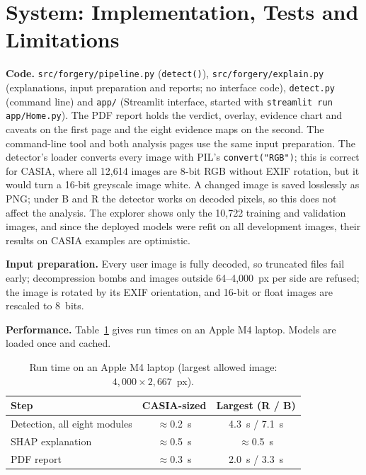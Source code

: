 \section{System: Implementation, Tests and Limitations}\label{app:system}

\textbf{Code.} \texttt{src/forgery/pipeline.py} (\texttt{detect()}), \texttt{src/forgery/explain.py} (explanations,
input preparation and reports; no interface code), \texttt{detect.py} (command line) and \texttt{app/} (Streamlit
interface, started with \texttt{streamlit run app/Home.py}). The PDF report holds the verdict, overlay, evidence chart
and caveats on the first page and the eight evidence maps on the second. The command-line tool and both analysis pages
use the same input preparation. The detector's loader converts every image with PIL's \texttt{convert("RGB")}; this
is correct for CASIA, where all 12,614 images are 8-bit RGB without EXIF rotation, but it would turn a 16-bit greyscale
image white. A changed image is saved losslessly as PNG; under B and R the detector works on decoded pixels, so this
does not affect the analysis. The explorer shows only the 10,722 training and validation images, and since the
deployed models were refit on all development images, their results on CASIA examples are optimistic.

\textbf{Input preparation.} Every user image is fully decoded, so truncated files fail early; decompression bombs and
images outside 64--4,000~px per side are refused; the image is rotated by its EXIF orientation, and 16-bit or float
images are rescaled to 8~bits.

\textbf{Performance.} Table~\ref{tab:sys-perf} gives run times on an Apple M4 laptop. Models are loaded once and
cached.

\begin{table}[!ht]
\centering
\caption{Run time on an Apple M4 laptop (largest allowed image: $4{,}000\times2{,}667$~px).}
\label{tab:sys-perf}
\footnotesize
\begin{tabular}{lcc}
\toprule
Step & CASIA-sized & Largest (R / B) \\
\midrule
Detection, all eight modules & $\approx$0.2~s & 4.3~s / 7.1~s \\
SHAP explanation & $\approx$0.5~s & $\approx$0.5~s \\
PDF report & $\approx$0.3~s & 2.0~s / 3.3~s \\
\bottomrule
\end{tabular}
\end{table}

